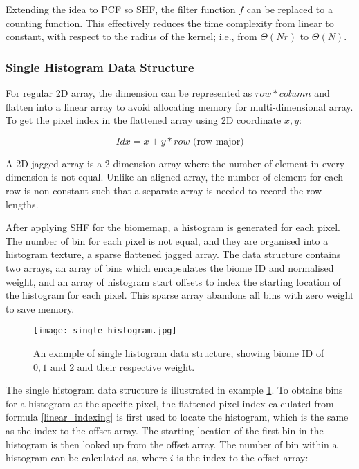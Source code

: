 \documentclass[oneside, a4paper]{report}
\begin{document}
    Extending the idea to PCF so SHF, the filter function \(f\) can be replaced to a counting function. This effectively reduces the time complexity from linear to constant, with respect to the radius of the kernel; i.e., from \(\Theta(Nr)\) to \(\Theta(N)\).

    \subsubsection{Single Histogram Data Structure}

    For regular 2D array, the dimension can be represented as \(row * column\) and flatten into a linear array to avoid allocating memory for multi-dimensional array. To get the pixel index in the flattened array using 2D coordinate \(x, y\):

    \begin{equation}
        \label{linear_indexing}
        Idx = x + y * row \text{ (row-major)}
    \end{equation}

    A 2D jagged array is a 2-dimension array where the number of element in every dimension is not equal. Unlike an aligned array, the number of element for each row is non-constant such that a separate array is needed to record the row lengths.

    After applying SHF for the biomemap, a histogram is generated for each pixel. The number of bin for each pixel is not equal, and they are organised into a histogram texture, a sparse flattened jagged array. The data structure contains two arrays, an array of bins which encapsulates the biome ID and normalised weight, and an array of histogram start offsets to index the starting location of the histogram for each pixel. This sparse array abandons all bins with zero weight to save memory.

    \begin{figure}[H]
        \texttt{[image: single-histogram.jpg]}
        \caption{An example of single histogram data structure, showing biome ID of \(0, 1 \text{ and } 2\) and their respective weight.}
        \label{histogram_data_structure}
    \end{figure}

    The single histogram data structure is illustrated in example \ref{histogram_data_structure}. To obtains bins for a histogram at the specific pixel, the flattened pixel index calculated from formula \ref{linear_indexing} is first used to locate the histogram, which is the same as the index to the offset array. The starting location of the first bin in the histogram is then looked up from the offset array. The number of bin within a histogram can be calculated as, where \(i\) is the index to the offset array:
\end{document}

